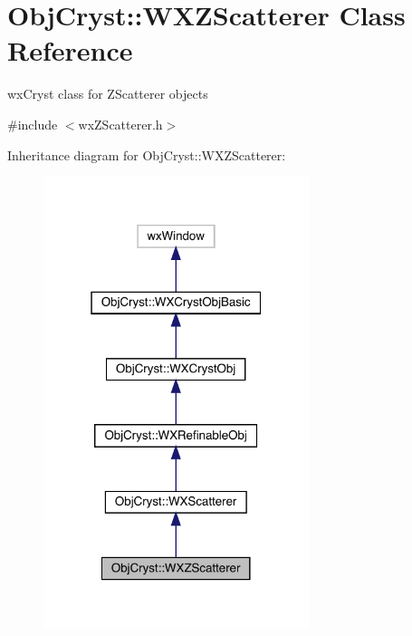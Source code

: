 \hypertarget{class_obj_cryst_1_1_w_x_z_scatterer}{}\section{Obj\+Cryst\+::W\+X\+Z\+Scatterer Class Reference}
\label{class_obj_cryst_1_1_w_x_z_scatterer}


wx\+Cryst class for Z\+Scatterer objects  




{\ttfamily \#include $<$wx\+Z\+Scatterer.\+h$>$}



Inheritance diagram for Obj\+Cryst\+::W\+X\+Z\+Scatterer\+:
\nopagebreak
\begin{figure}[H]
\begin{center}
\leavevmode
\includegraphics[width=220pt]{class_obj_cryst_1_1_w_x_z_scatterer__inherit__graph}
\end{center}
\end{figure}


